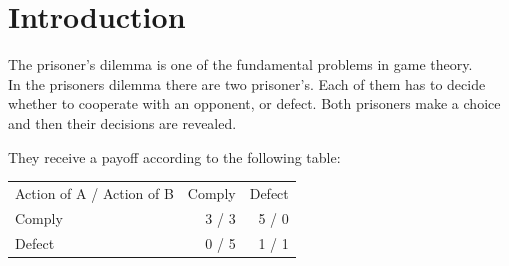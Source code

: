\documentclass[a4paper,12pt]{article}
\begin{document}
\maketitle

\newcommand{\fittable}[1]{\begin{center}
\resizebox{\textwidth}{!}{#1}\end{center}
}

\newcommand{\img}[4]{
 \begin{figure}[!htp]
\centering
  \texttt{[image: \#2]}
  \caption{\emph{#3}}
  \label{#4}
 \end{figure}
}
\newcommand{\imgit}[4]{
\\[\intextsep]
\begin{minipage}{\linewidth}
  \centering%
  \texttt{[image: \#2]}%
  \figcaption{\emph{#3}}%
  \label{#4}%
\end{minipage}
\\[\intextsep]
}

\newcommand{\imgitX}[2]{
  {\centering
\fbox{
\begin{minipage}{#1\textwidth}
  \vskip .5em
  \centering
  \texttt{[image: \#2]}
  \vskip .5em
\end{minipage}
}
  }
}


\newpage

\tableofcontents

\section{Introduction}

The prisoner's dilemma is one of the fundamental problems in game theory.\\
In the prisoners dilemma there are two prisoner's.
Each of them has to decide whether to cooperate with an opponent, or defect.
Both prisoners make a choice and then their decisions are revealed. 

They receive a payoff according to the following table: 

\begin{table}[h]
	\centering
		\begin{tabular}{| l | r | r |}
		\hline
			Action of A / Action of B & Comply & Defect \\
			Comply                    & 3 / 3 & 5 / 0\\
			Defect                    & 0 / 5 & 1 / 1\\
			\hline
		\end{tabular}  
\end{table}
\end{document}
